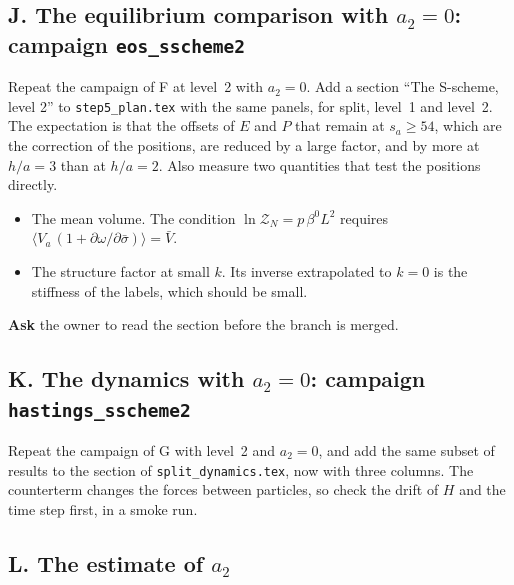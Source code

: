 \documentclass[11pt,aps,preprint,nofootinbib,superscriptaddress,tightenlines]{revtex4-2}
\begin{document}
\subsection{J. The equilibrium comparison with \texorpdfstring{$a_2=0$}{a2 = 0}: campaign \texttt{eos\_sscheme2}}

Repeat the campaign of F at level~2 with $a_2=0$.  Add a section ``The S-scheme, level 2'' to \nolinkurl{step5_plan.tex} with the
same panels, for split, level~1 and level~2.  The expectation is that the offsets of $E$ and $P$ that remain at $s_a\ge54$, which are the correction of
the positions, are reduced by a large factor, and by more at $h/a=3$ than at $h/a=2$.  Also measure two quantities that test the positions directly.
\begin{itemize}
\item The mean volume.  The condition $\ln\mathcal Z_N=p\,\beta^0L^2$ requires $\big\langle V_a\,(1+\partial\omega/\partial\bar\sigma)\big\rangle=\bar V$.
\item The structure factor at small $k$.  Its inverse extrapolated to $k=0$ is the stiffness of the labels, which should be small.
\end{itemize}
\textbf{Ask} the owner to read the section before the branch is merged.

\subsection{K. The dynamics with \texorpdfstring{$a_2=0$}{a2 = 0}: campaign \texttt{hastings\_sscheme2}}

Repeat the campaign of G with level~2 and $a_2=0$, and add the same subset of results to the section of \nolinkurl{split_dynamics.tex}, now with three
columns.  The counterterm changes the forces between particles, so check the drift of $H$ and the time step first, in a smoke run.

\subsection{L. The estimate of \texorpdfstring{$a_2$}{a2}}
\end{document}
